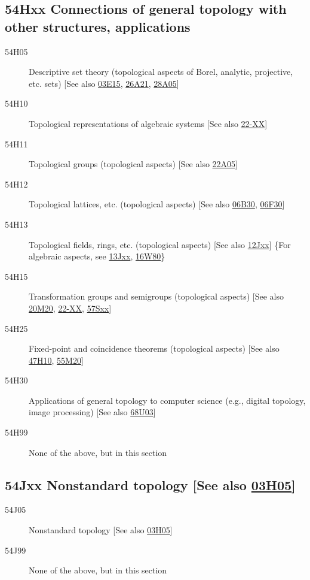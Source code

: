 \documentclass[letterpaper]{article}
\begin{document}
\subsection*{54Hxx  Connections of general topology with other structures, applications }\label{54Hxx}
\begin{description}  
\item [54H05]\label{54H05} Descriptive set theory (topological aspects of Borel, analytic, projective, etc. sets) [See also \hyperref[03E15]{03E15}, \hyperref[26A21]{26A21}, \hyperref[28A05]{28A05}]
\item [54H10]\label{54H10} Topological representations of algebraic systems [See also \hyperref[22-XX]{22-XX}]
\item [54H11]\label{54H11} Topological groups (topological aspects) [See also \hyperref[22A05]{22A05}]
\item [54H12]\label{54H12} Topological lattices, etc. (topological aspects) [See also \hyperref[06B30]{06B30}, \hyperref[06F30]{06F30}]
\item [54H13]\label{54H13} Topological fields, rings, etc. (topological aspects) [See also \hyperref[12Jxx]{12Jxx}] \{For algebraic aspects, see \hyperref[13Jxx]{13Jxx}, \hyperref[16W80]{16W80}\}
\item [54H15]\label{54H15} Transformation groups and semigroups (topological aspects) [See also \hyperref[20M20]{20M20}, \hyperref[22-XX]{22-XX}, \hyperref[57Sxx]{57Sxx}]
\item [54H25]\label{54H25} Fixed-point and coincidence theorems (topological aspects) [See also \hyperref[47H10]{47H10}, \hyperref[55M20]{55M20}]
\item [54H30]\label{54H30} Applications of general topology to computer science (e.g., digital topology, image processing) [See also \hyperref[68U03]{68U03}]
\item [54H99]\label{54H99} None of the above, but in this section
\end{description}
\subsection*{54Jxx  Nonstandard topology [See also \hyperref[03H05]{03H05}] }\label{54Jxx}
\begin{description}
\item [54J05]\label{54J05} Nonstandard topology [See also \hyperref[03H05]{03H05}]
\item [54J99]\label{54J99} None of the above, but in this section
\end{description}
\end{document}
